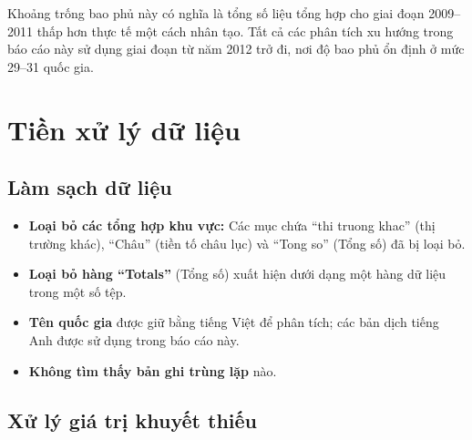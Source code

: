 \documentclass[
]{article}
\providecommand{\tightlist}{%
  \setlength{\itemsep}{0pt}\setlength{\parskip}{0pt}}
\begin{document}
Khoảng trống bao phủ này có nghĩa là tổng số liệu tổng hợp cho giai đoạn
2009--2011 thấp hơn thực tế một cách nhân tạo. Tất cả các phân tích xu
hướng trong báo cáo này sử dụng giai đoạn từ năm 2012 trở đi, nơi độ bao
phủ ổn định ở mức 29--31 quốc gia.

\newpage

\section{Tiền xử lý dữ
liệu}\label{tiux1ec1n-xux1eed-luxfd-dux1eef-liux1ec7u}

\subsection{Làm sạch dữ liệu}\label{luxe0m-sux1ea1ch-dux1eef-liux1ec7u}

\begin{itemize}
\tightlist
\item
  \textbf{Loại bỏ các tổng hợp khu vực:} Các mục chứa ``thi truong
  khac'' (thị trường khác), ``Châu'' (tiền tố châu lục) và ``Tong so''
  (Tổng số) đã bị loại bỏ.
\item
  \textbf{Loại bỏ hàng ``Totals''} (Tổng số) xuất hiện dưới dạng một
  hàng dữ liệu trong một số tệp.
\item
  \textbf{Tên quốc gia} được giữ bằng tiếng Việt để phân tích; các bản
  dịch tiếng Anh được sử dụng trong báo cáo này.
\item
  \textbf{Không tìm thấy bản ghi trùng lặp} nào.
\end{itemize}

\subsection{Xử lý giá trị khuyết
thiếu}\label{xux1eed-luxfd-giuxe1-trux1ecb-khuyux1ebft-thiux1ebfu}
\end{document}
